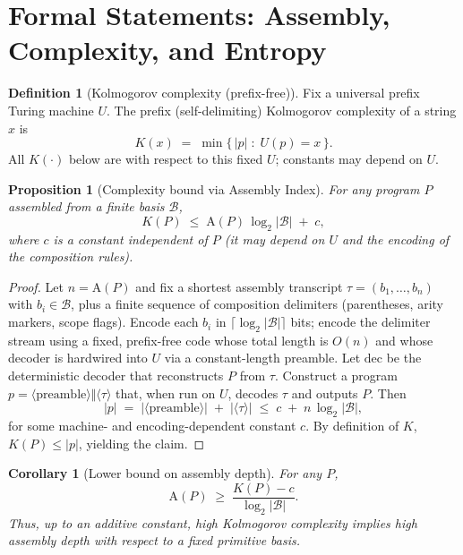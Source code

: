 \documentclass[12pt,a4paper]{article}
\theoremstyle{plain}
\newtheorem{proposition}[theorem]{Proposition}
\newtheorem{corollary}[theorem]{Corollary}
\theoremstyle{definition}
\newtheorem{definition}[theorem]{Definition}
\theoremstyle{remark}
\newcommand{\AI}{\mathrm{A}}
\begin{document}
\section{Formal Statements: Assembly, Complexity, and Entropy}
\label{sec:formal-statements}

\begin{definition}[Kolmogorov complexity (prefix-free)]
Fix a universal prefix Turing machine $U$. The prefix (self-delimiting) Kolmogorov complexity of a string $x$ is
\[
K(x)\;=\;\min\{\,|p|\;:\; U(p)=x\,\}.
\]
All $K(\cdot)$ below are with respect to this fixed $U$; constants may depend on $U$.
\end{definition}

\begin{proposition}[Complexity bound via Assembly Index]
\label{prop:K-vs-AI}
For any program $P$ assembled from a finite basis $\mathcal{B}$,
\[
K(P)\;\le\; \AI(P)\,\log_2|\mathcal{B}|\;+\;c,
\]
where $c$ is a constant independent of $P$ (it may depend on $U$ and the encoding of the composition rules).
\end{proposition}

\begin{proof}
Let $n=\AI(P)$ and fix a shortest assembly transcript $\tau=(b_1,\dots,b_n)$ with $b_i\in\mathcal{B}$, plus a finite sequence of composition delimiters (parentheses, arity markers, scope flags). Encode each $b_i$ in $\lceil \log_2|\mathcal{B}|\rceil$ bits; encode the delimiter stream using a fixed, prefix-free code whose total length is $O(n)$ and whose decoder is hardwired into $U$ via a constant-length preamble. Let $\mathrm{dec}$ be the deterministic decoder that reconstructs $P$ from $\tau$. Construct a program $p=\langle \mathrm{preamble}\rangle\Vert\langle \tau\rangle$ that, when run on $U$, decodes $\tau$ and outputs $P$. Then
\[
|p| \;=\; |\langle \mathrm{preamble}\rangle| \;+\; |\langle \tau\rangle| \;\le\; c \;+\; n\,\log_2|\mathcal{B}|,
\]
for some machine- and encoding-dependent constant $c$. By definition of $K$, $K(P)\le |p|$, yielding the claim.
\end{proof}

\begin{corollary}[Lower bound on assembly depth]
\label{cor:AI-lower}
For any $P$,
\[
\AI(P)\;\ge\; \frac{K(P)-c}{\log_2|\mathcal{B}|}.
\]
Thus, up to an additive constant, \emph{high} Kolmogorov complexity implies \emph{high} assembly depth with respect to a fixed primitive basis.
\end{corollary}
\end{document}
